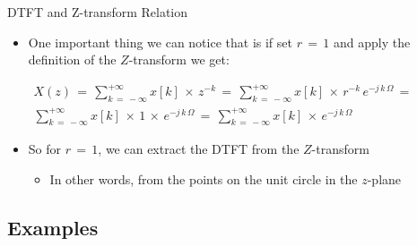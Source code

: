 \documentclass{beamer}
\begin{document}
\begin{frame}[t,allowframebreaks]{DTFT and Z-transform Relation}

\begin{itemize}

\item One important thing we can notice that is if set $r \, = \, 1$ and apply the definition of the $Z$-transform we get:

$\begin{array}{rcl}
X(z) \, = \, \displaystyle\sum_{k \, = \, - \infty}^{+ \infty} x[k] \, \times \, z^{-k} \, = \, \displaystyle\sum_{k \, = \, - \infty}^{+ \infty} x[k] \, \times \, r^{-k} \, e^{-j \, k \, \Omega} \, = \, \\ \displaystyle\sum_{k \, = \, - \infty}^{+ \infty} x[k] \, \times \, 1 \, \times  \, e^{-j \, k \, \Omega} \, = \,
\displaystyle\sum_{k \, = \, - \infty}^{+ \infty} x[k] \, \times \, e^{-j \, k \, \Omega}  
\end{array}$

\item So for $r \, = \, 1$, we can extract the DTFT from the $Z$-transform

	\begin{itemize}
	\item In other words, from the points on the unit circle in the $z$-plane
	\end{itemize}

\end{itemize}


\end{frame}


\subsection{Examples}
\end{document}
